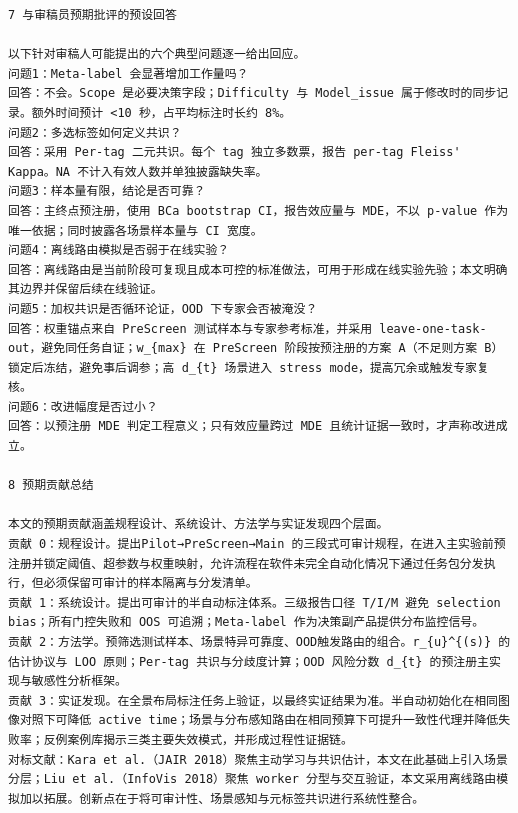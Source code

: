 \documentclass[a4paper,12pt]{article}
\begin{document}
\begin{Verbatim}[fontsize=\small,breaklines=true,breakanywhere=true]
7 与审稿员预期批评的预设回答

以下针对审稿人可能提出的六个典型问题逐一给出回应。
问题1：Meta-label 会显著增加工作量吗？
回答：不会。Scope 是必要决策字段；Difficulty 与 Model_issue 属于修改时的同步记录。额外时间预计 <10 秒，占平均标注时长约 8%。
问题2：多选标签如何定义共识？
回答：采用 Per-tag 二元共识。每个 tag 独立多数票，报告 per-tag Fleiss' Kappa。NA 不计入有效人数并单独披露缺失率。
问题3：样本量有限，结论是否可靠？
回答：主终点预注册，使用 BCa bootstrap CI，报告效应量与 MDE，不以 p-value 作为唯一依据；同时披露各场景样本量与 CI 宽度。
问题4：离线路由模拟是否弱于在线实验？
回答：离线路由是当前阶段可复现且成本可控的标准做法，可用于形成在线实验先验；本文明确其边界并保留后续在线验证。
问题5：加权共识是否循环论证，OOD 下专家会否被淹没？
回答：权重锚点来自 PreScreen 测试样本与专家参考标准，并采用 leave-one-task-out，避免同任务自证；w_{max} 在 PreScreen 阶段按预注册的方案 A（不足则方案 B）锁定后冻结，避免事后调参；高 d_{t} 场景进入 stress mode，提高冗余或触发专家复核。
问题6：改进幅度是否过小？
回答：以预注册 MDE 判定工程意义；只有效应量跨过 MDE 且统计证据一致时，才声称改进成立。

8 预期贡献总结

本文的预期贡献涵盖规程设计、系统设计、方法学与实证发现四个层面。
贡献 0：规程设计。提出Pilot→PreScreen→Main 的三段式可审计规程，在进入主实验前预注册并锁定阈值、超参数与权重映射，允许流程在软件未完全自动化情况下通过任务包分发执行，但必须保留可审计的样本隔离与分发清单。
贡献 1：系统设计。提出可审计的半自动标注体系。三级报告口径 T/I/M 避免 selection bias；所有门控失败和 OOS 可追溯；Meta-label 作为决策副产品提供分布监控信号。
贡献 2：方法学。预筛选测试样本、场景特异可靠度、OOD触发路由的组合。r_{u}^{(s)} 的估计协议与 LOO 原则；Per-tag 共识与分歧度计算；OOD 风险分数 d_{t} 的预注册主实现与敏感性分析框架。
贡献 3：实证发现。在全景布局标注任务上验证，以最终实证结果为准。半自动初始化在相同图像对照下可降低 active time；场景与分布感知路由在相同预算下可提升一致性代理并降低失败率；反例案例库揭示三类主要失效模式，并形成过程性证据链。
对标文献：Kara et al.（JAIR 2018）聚焦主动学习与共识估计，本文在此基础上引入场景分层；Liu et al.（InfoVis 2018）聚焦 worker 分型与交互验证，本文采用离线路由模拟加以拓展。创新点在于将可审计性、场景感知与元标签共识进行系统性整合。

\end{Verbatim}
\end{document}
